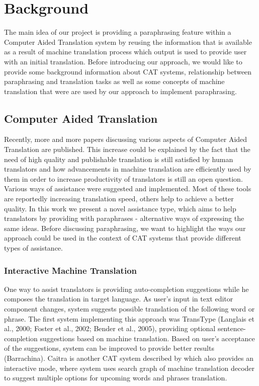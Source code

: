 \chapter{Background}


The main idea of our project is providing a paraphrasing feature within a Computer Aided Translation system by reusing the information that is available as a result of machine translation process which output is used to provide user with an initial translation. Before introducing our approach, we would like to provide some background information about CAT systems, relationship between paraphrasing and translation tasks as well as some concepts of machine translation that were are used by our approach to implement paraphrasing.  

\section{Computer Aided Translation}

Recently, more and more papers discussing various aspects of Computer Aided Translation are published. This increase could be explained by the fact that the need of high quality and publishable translation is still satisfied by human translators and how advancements in machine translation are efficiently used by them in order to increase productivity of translators is still an open question. Various ways of assistance were suggested and implemented. Most of these tools are reportedly increasing translation speed, others help to achieve a better quality. In this work we present a novel assistance type, which aims to help translators by providing with paraphrases - alternative ways of expressing the same ideas. Before discussing paraphrasing, we want to highlight the ways our approach could be used in the context of CAT systems that provide different types of assistance.


\subsection{Interactive Machine Translation}

One way to assist translators is providing auto-completion suggestions while he composes the translation in target language. As user's input in text editor component changes, system suggests possible translation of the following word or phrase. The first system implementing this approach was TransType (Langlais et al., 2000; Foster et al., 2002; Bender et al., 2005), providing optional sentence-completion suggestions based on machine translation.  Based on user's acceptance of the suggestions, system can be improved to provide better results (Barrachina). Caitra is another CAT system described by \cite{KoehnHaddow2009} which also provides an interactive mode, where system uses search graph of machine translation decoder to suggest multiple options for upcoming words and phrases translation. 

